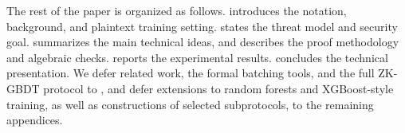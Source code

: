 The rest of the paper is organized as follows. 
introduces the notation, background, and plaintext training setting.
 states the threat model and security goal.
 summarizes the main technical ideas, and
 describes the proof methodology and algebraic checks.
 reports the experimental results.
 concludes the technical presentation.
We defer related work, the formal batching tools, and the full ZK-GBDT protocol
to , and defer extensions to
random forests and XGBoost-style training, as well as constructions of selected
subprotocols, to the remaining appendices.
